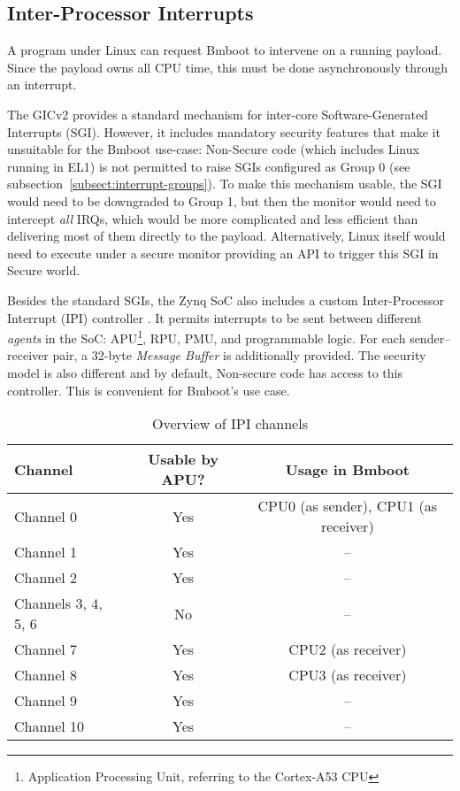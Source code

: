 \subsection{Inter-Processor Interrupts} \label{ssec:ipi}

A program under Linux can request Bmboot to intervene on a running payload. Since the payload owns all CPU time, this must be done asynchronously through an interrupt.

The GICv2 provides a standard mechanism for inter-core Software-Generated Interrupts (SGI). However, it includes mandatory security features that make it unsuitable for the Bmboot use-case: Non-Secure code (which includes Linux running in EL1) is not permitted to raise SGIs configured as Group 0 (see subsection~\ref{subsect:interrupt-groups}). To make this mechanism usable, the SGI would need to be downgraded to Group 1, but then the monitor would need to intercept \textit{all} IRQs, which would be more complicated and less efficient than delivering most of them directly to the payload. Alternatively, Linux itself would need to execute under a secure monitor providing an API to trigger this SGI in Secure world.

Besides the standard SGIs, the Zynq SoC also includes a custom Inter-Processor Interrupt (IPI) controller \cite{zynqmp-trm}. It permits interrupts to be sent between different \textit{agents} in the SoC: APU\footnote{Application Processing Unit, referring to the Cortex-A53 CPU}, RPU, PMU, and programmable logic. For each sender--receiver pair, a 32-byte \textit{Message Buffer} is additionally provided. The security model is also different and by default, Non-secure code has access to this controller. This is convenient for Bmboot's use case.

\begin{table}[h]
  \centering
  \begin{tabular}{lcc}\toprule
  \textbf{Channel} & \textbf{Usable by APU?} & \textbf{Usage in Bmboot} \\\midrule
  Channel 0 & Yes & CPU0 (as sender), CPU1 (as receiver) \\
  Channel 1 & Yes & -- \\
  Channel 2 & Yes & -- \\
  Channels 3, 4, 5, 6 & No & -- \\
  Channel 7 & Yes & CPU2 (as receiver) \\
  Channel 8 & Yes & CPU3 (as receiver) \\
  Channel 9 & Yes & -- \\
  Channel 10 & Yes & -- \\\bottomrule
  \end{tabular}

  \caption{Overview of IPI channels}
  \label{tab:ipi-channels}
\end{table}

